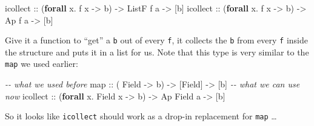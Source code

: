 \documentclass[]{article}
\newenvironment{Shaded}{}{}
\newcommand{\CommentTok}[1]{\textcolor[rgb]{0.38,0.63,0.69}{\textit{#1}}}
\newcommand{\DataTypeTok}[1]{\textcolor[rgb]{0.56,0.13,0.00}{#1}}
\newcommand{\FunctionTok}[1]{\textcolor[rgb]{0.02,0.16,0.49}{#1}}
\newcommand{\KeywordTok}[1]{\textcolor[rgb]{0.00,0.44,0.13}{\textbf{#1}}}
\newcommand{\NormalTok}[1]{#1}
\newcommand{\OperatorTok}[1]{\textcolor[rgb]{0.40,0.40,0.40}{#1}}
\newcommand{\OtherTok}[1]{\textcolor[rgb]{0.00,0.44,0.13}{#1}}
\begin{document}
\begin{Shaded}
\begin{Highlighting}[]
\OtherTok{icollect ::}\NormalTok{ (}\KeywordTok{forall}\NormalTok{ x}\OperatorTok{.}\NormalTok{ f x }\OtherTok{{-}>}\NormalTok{ b) }\OtherTok{{-}>} \DataTypeTok{ListF}\NormalTok{ f a }\OtherTok{{-}>}\NormalTok{ [b]}
\OtherTok{icollect ::}\NormalTok{ (}\KeywordTok{forall}\NormalTok{ x}\OperatorTok{.}\NormalTok{ f x }\OtherTok{{-}>}\NormalTok{ b) }\OtherTok{{-}>} \DataTypeTok{Ap}\NormalTok{    f a }\OtherTok{{-}>}\NormalTok{ [b]}
\end{Highlighting}
\end{Shaded}

Give it a function to ``get'' a \texttt{b} out of every \texttt{f}, it collects
the \texttt{b} from every \texttt{f} inside the structure and puts it in a list
for us. Note that this type is very similar to the \texttt{map} we used earlier:

\begin{Shaded}
\begin{Highlighting}[]
\CommentTok{{-}{-} what we used before}
\FunctionTok{map}\OtherTok{      ::}\NormalTok{ (          }\DataTypeTok{Field}   \OtherTok{{-}>}\NormalTok{ b) }\OtherTok{{-}>}\NormalTok{ [}\DataTypeTok{Field}\NormalTok{]    }\OtherTok{{-}>}\NormalTok{ [b]}
\CommentTok{{-}{-} what we can use now}
\OtherTok{icollect ::}\NormalTok{ (}\KeywordTok{forall}\NormalTok{ x}\OperatorTok{.} \DataTypeTok{Field}\NormalTok{ x }\OtherTok{{-}>}\NormalTok{ b) }\OtherTok{{-}>} \DataTypeTok{Ap} \DataTypeTok{Field}\NormalTok{ a }\OtherTok{{-}>}\NormalTok{ [b]}
\end{Highlighting}
\end{Shaded}

So it looks like \texttt{icollect} should work as a drop-in replacement for
\texttt{map} \ldots{}
\end{document}
